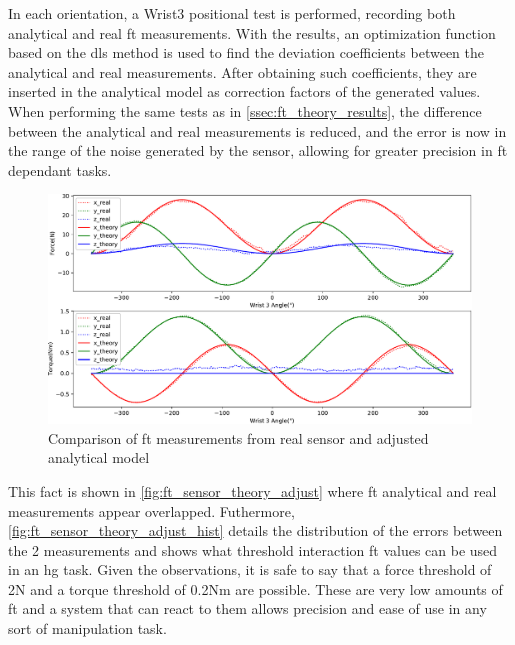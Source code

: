 \par In each orientation, a Wrist3 positional test is performed, recording both analytical and real \ac{ft} measurements. With the results, an optimization function based on the \ac{dls} method is used to find the deviation coefficients between the analytical and real measurements. After obtaining such coefficients, they are inserted in the analytical model as correction factors of the generated values. When performing the same tests as in \autoref{ssec:ft_theory_results}, the difference between the analytical and real measurements is reduced, and the error is now in the range of the noise generated by the sensor, allowing for greater precision in \ac{ft} dependant tasks.

\begin{figure}[h]
    \centering
    \includegraphics[width=0.8\linewidth]{figs/chp3/ft_sensor_theory_adjust.pdf}
    \caption{Comparison of \ac{ft} measurements from real sensor and adjusted analytical model}
    \label{fig:ft_sensor_theory_adjust}
\end{figure}

\par This fact is shown in \autoref{fig:ft_sensor_theory_adjust} where \ac{ft} analytical and real measurements appear overlapped. Futhermore, \autoref{fig:ft_sensor_theory_adjust_hist} details the distribution of the errors between the 2 measurements and shows what threshold interaction \ac{ft} values can be used in an \ac{hg} task. Given the observations, it is safe to say that a force threshold of 2N and a torque threshold of 0.2Nm are possible. These are very low amounts of \ac{ft} and a system that can react to them allows precision and ease of use in any sort of manipulation task.

